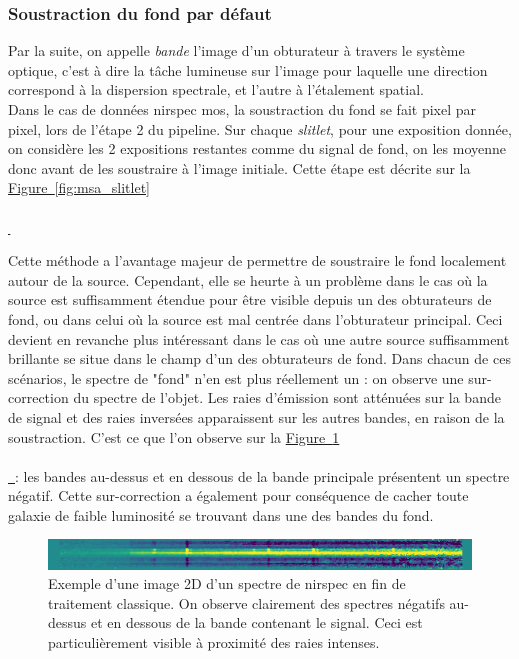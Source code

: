 \documentclass[12pt, a4paper]{article}
\newcommand*{\figref}[2][]{%
  \hyperref[{#2}]{%
    Figure~\ref*{#2}%
    \ifx\\#1\\%
    \else
      \,#1%
    \fi
  }%
}
\begin{document}
  \subsubsection{Soustraction du fond par défaut}

  Par la suite, on appelle \textit{bande} l'image d'un obturateur à travers le système optique, c'est à dire la tâche lumineuse sur l'image pour laquelle une direction correspond à la dispersion spectrale, et l'autre à l'étalement spatial.\\

  Dans le cas de données \gls{nirspec} \gls{mos}, la soustraction du fond se fait pixel par pixel, lors de l'étape 2 du pipeline. Sur chaque \textit{slitlet}, pour une exposition donnée, on considère les 2 expositions restantes comme du signal de fond, on les moyenne donc avant de les soustraire à l'image initiale. Cette étape est décrite sur la \figref{fig:msa_slitlet}

  Cette méthode a l'avantage majeur de permettre de soustraire le fond localement autour de la source. Cependant, elle se heurte à un problème dans le cas où la source est suffisamment étendue pour être visible depuis un des obturateurs de fond, ou dans celui où la source est mal centrée dans l'obturateur principal. Ceci devient en revanche plus intéressant dans le cas où une autre source suffisamment brillante se situe dans le champ d'un des obturateurs de fond. Dans chacun de ces scénarios, le spectre de "fond" n'en est plus réellement un : on observe une sur-correction du spectre de l'objet. Les raies d'émission sont atténuées sur la bande de signal et des raies inversées apparaissent sur les autres bandes, en raison de la soustraction. C'est ce que l'on observe sur la \figref{fig:negative_trace} : les bandes au-dessus et en dessous de la bande principale présentent un spectre négatif. Cette sur-correction a également pour conséquence de cacher toute galaxie de faible luminosité se trouvant dans une des bandes du fond.\\
  
  \begin{figure}[H]
    \centering
    \includegraphics[scale=1.1]{assets/negative_trace_nirspec.png}
    \caption{Exemple d'une image 2D d'un spectre de \gls{nirspec} en fin de traitement classique. On observe clairement des spectres négatifs au-dessus et en dessous de la bande contenant le signal. Ceci est particulièrement visible à proximité des raies intenses.}
    \label{fig:negative_trace}
  \end{figure}
\end{document}
